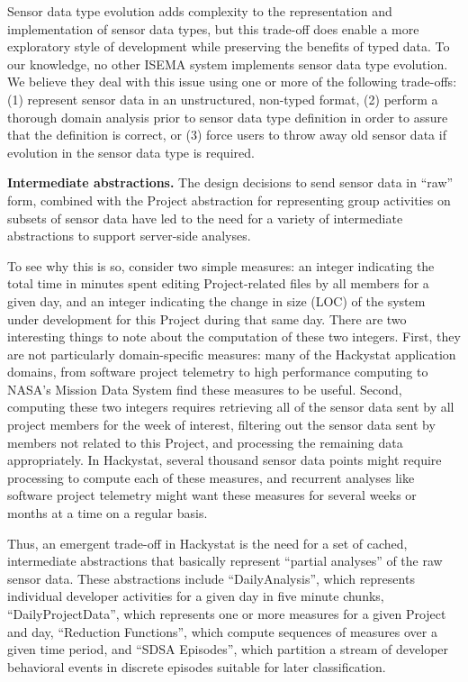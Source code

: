 \documentclass[10pt,twocolumn]{article}
\begin{document}
Sensor data type evolution adds complexity to the representation and
implementation of sensor data types, but this trade-off does enable a more
exploratory style of development while preserving the benefits of typed
data.  To our knowledge, no other ISEMA system implements sensor data type
evolution. We believe they deal with this issue using one or more of the
following trade-offs: (1) represent sensor data in an unstructured, non-typed
format, (2) perform a thorough domain analysis prior to sensor data type
definition in order to assure that the definition is correct, or (3) force
users to throw away old sensor data if evolution in the sensor data type is
required.

{\bf Intermediate abstractions.} The design decisions to send sensor data
in ``raw'' form, combined with the Project abstraction for representing
group activities on subsets of sensor data have led to the need for a
variety of intermediate abstractions to support server-side analyses.

To see why this is so, consider two simple measures: an integer indicating
the total time in minutes spent editing Project-related files by all
members for a given day, and an integer indicating the change in size (LOC)
of the system under development for this Project during that same day.
There are two interesting things to note about the computation of these two
integers. First, they are not particularly domain-specific measures: many
of the Hackystat application domains, from software project telemetry to
high performance computing to NASA's Mission Data System find these
measures to be useful. Second, computing these two integers requires
retrieving all of the sensor data sent by all project members for the week
of interest, filtering out the sensor data sent by members not related to
this Project, and processing the remaining data appropriately. In
Hackystat, several thousand sensor data points might require processing to
compute each of these measures, and recurrent analyses like software
project telemetry might want these measures for several weeks or months at
a time on a regular basis.

Thus, an emergent trade-off in Hackystat is the need for a set of cached, 
intermediate abstractions that basically represent ``partial analyses'' of
the raw sensor data.   These abstractions include ``DailyAnalysis'', which 
represents individual developer activities for a given day in five minute chunks,
``DailyProjectData'', which represents one or more measures for a given Project
and day, ``Reduction Functions'', which compute sequences of measures over a given
time period, and ``SDSA Episodes'', which partition a stream of developer behavioral
events in discrete episodes suitable for later classification. 
\end{document}
